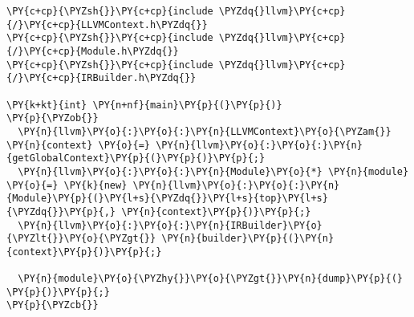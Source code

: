 \begin{Verbatim}[commandchars=\\\{\}]
\PY{c+cp}{\PYZsh{}}\PY{c+cp}{include \PYZdq{}llvm}\PY{c+cp}{/}\PY{c+cp}{LLVMContext.h\PYZdq{}}
\PY{c+cp}{\PYZsh{}}\PY{c+cp}{include \PYZdq{}llvm}\PY{c+cp}{/}\PY{c+cp}{Module.h\PYZdq{}}
\PY{c+cp}{\PYZsh{}}\PY{c+cp}{include \PYZdq{}llvm}\PY{c+cp}{/}\PY{c+cp}{IRBuilder.h\PYZdq{}}

\PY{k+kt}{int} \PY{n+nf}{main}\PY{p}{(}\PY{p}{)}
\PY{p}{\PYZob{}}
  \PY{n}{llvm}\PY{o}{:}\PY{o}{:}\PY{n}{LLVMContext}\PY{o}{\PYZam{}} \PY{n}{context} \PY{o}{=} \PY{n}{llvm}\PY{o}{:}\PY{o}{:}\PY{n}{getGlobalContext}\PY{p}{(}\PY{p}{)}\PY{p}{;}
  \PY{n}{llvm}\PY{o}{:}\PY{o}{:}\PY{n}{Module}\PY{o}{*} \PY{n}{module} \PY{o}{=} \PY{k}{new} \PY{n}{llvm}\PY{o}{:}\PY{o}{:}\PY{n}{Module}\PY{p}{(}\PY{l+s}{\PYZdq{}}\PY{l+s}{top}\PY{l+s}{\PYZdq{}}\PY{p}{,} \PY{n}{context}\PY{p}{)}\PY{p}{;}
  \PY{n}{llvm}\PY{o}{:}\PY{o}{:}\PY{n}{IRBuilder}\PY{o}{\PYZlt{}}\PY{o}{\PYZgt{}} \PY{n}{builder}\PY{p}{(}\PY{n}{context}\PY{p}{)}\PY{p}{;} 

  \PY{n}{module}\PY{o}{\PYZhy{}}\PY{o}{\PYZgt{}}\PY{n}{dump}\PY{p}{(} \PY{p}{)}\PY{p}{;}
\PY{p}{\PYZcb{}}
\end{Verbatim}
